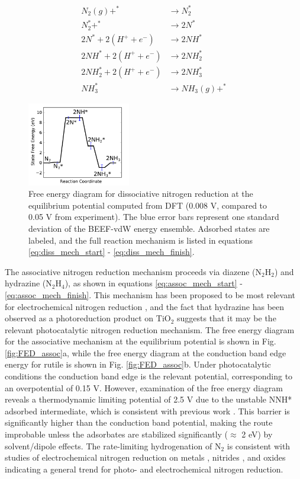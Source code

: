 \documentclass[journal=ascecg,manuscript=article,articletitle=true]{achemso}
\begin{document}
\begin{align}
	\label{eq:diss_mech_start}
	N_2(g)+^*  & \rightarrow N_2^{*} \\
    N_2^* + ^*  & \rightarrow 2N^*\\
    2N^* + 2(H^+ + e^-) & \rightarrow 2NH^* \\
    2NH^* + 2(H^+ + e^-) & \rightarrow 2NH_2^* \\
    2NH_2^* + 2(H^+ + e^-) & \rightarrow 2NH_3^* \\
    NH_3^*  & \rightarrow NH_3(g) + ^{*}
    \label{eq:diss_mech_finish}
\end{align}

\begin{figure}
\includegraphics[width=0.4\textwidth]{figures/dissociative_path_edited.pdf}
\caption{Free energy diagram for dissociative nitrogen reduction at the equilibrium potential computed from DFT (0.008 V, compared to 0.05 V from experiment). The blue error bars represent one standard deviation of the BEEF-vdW energy ensemble. Adsorbed states are labeled, and the full reaction mechanism is listed in equations \ref{eq:diss_mech_start} - \ref{eq:diss_mech_finish}.}
\label{fig:reaction_mechanism_diss}
\end{figure}

The associative nitrogen reduction mechanism proceeds via diazene (N$_2$H$_2$) and hydrazine (N$_2$H$_4$), as shown in equations \ref{eq:assoc_mech_start} - \ref{eq:assoc_mech_finish}. This mechanism has been proposed to be most relevant for electrochemical nitrogen reduction \cite{H_skuldsson_2017,Skulason_2012,van_der_Ham_2014}, and the fact that hydrazine has been observed as a photoreduction product on TiO$_2$ \cite{Schrauzer_2011} suggests that it may be the relevant photocatalytic nitrogen reduction mechanism. The free energy diagram for the associative mechanism at the equilibrium potential is shown in Fig. \ref{fig:FED_assoc}a, while the free energy diagram at the conduction band edge energy for rutile is shown in Fig. \ref{fig:FED_assoc}b. Under photocatalytic conditions the conduction band edge is the relevant potential, corresponding to an overpotential of 0.15 V. However, examination of the free energy diagram reveals a thermodynamic limiting potential of 2.5 V due to the unstable NNH* adsorbed intermediate, which is consistent with previous work \cite{H_skuldsson_2017}. This barrier is significantly higher than the conduction band potential, making the route improbable unless the adsorbates are stabilized significantly ($\approx$ 2 eV) by solvent/dipole effects. The rate-limiting hydrogenation of N$_2$ is consistent with studies of electrochemical nitrogen reduction on metals \cite{Skulason_2012}, nitrides \cite{Abghoui_2016}, and oxides \cite{H_skuldsson_2017} indicating a general trend for photo- and electrochemical nitrogen reduction.
\end{document}
